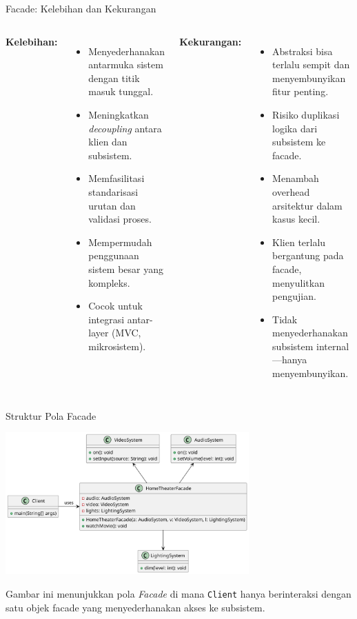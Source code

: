 \documentclass[aspectratio=169, table]{beamer}
\begin{document}
\begin{frame}{Facade: Kelebihan dan Kekurangan}
	\vspace{20pt}
	\begin{columns}[t]
		\textbf{Kelebihan:}
		\begin{itemize}
			\item Menyederhanakan antarmuka sistem dengan titik masuk tunggal.
			\item Meningkatkan \textit{decoupling} antara klien dan subsistem.
			\item Memfasilitasi standarisasi urutan dan validasi proses.
			\item Mempermudah penggunaan sistem besar yang kompleks.
			\item Cocok untuk integrasi antar-layer (MVC, mikrosistem).
		\end{itemize}
		
		\textbf{Kekurangan:}
		\begin{itemize}
			\item Abstraksi bisa terlalu sempit dan menyembunyikan fitur penting.
			\item Risiko duplikasi logika dari subsistem ke facade.
			\item Menambah overhead arsitektur dalam kasus kecil.
			\item Klien terlalu bergantung pada facade, menyulitkan pengujian.
			\item Tidak menyederhanakan subsistem internal—hanya menyembunyikan.
		\end{itemize}
	\end{columns}
\end{frame}


\begin{frame}{Struktur Pola Facade}
	\vspace{20pt}
	\begin{center}
		\includegraphics[width=0.7\textwidth]{../../figures/out/facade.png}
	\end{center}
	\small Gambar ini menunjukkan pola \textit{Facade} di mana \texttt{Client} hanya berinteraksi dengan satu objek facade yang menyederhanakan akses ke subsistem.
\end{frame}
\end{document}

